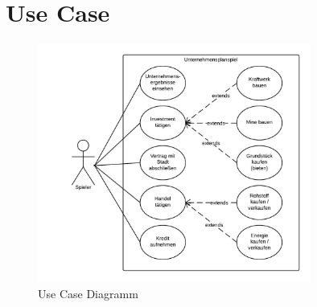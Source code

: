 \section{Use Case}

\begin{figure}[H]
\centering
\centering
\includegraphics[width=0.8\textwidth]{se-wa-jpg/usecase}
\caption{Use Case Diagramm}
\label{Use Case Diagramm}
\end{figure}
